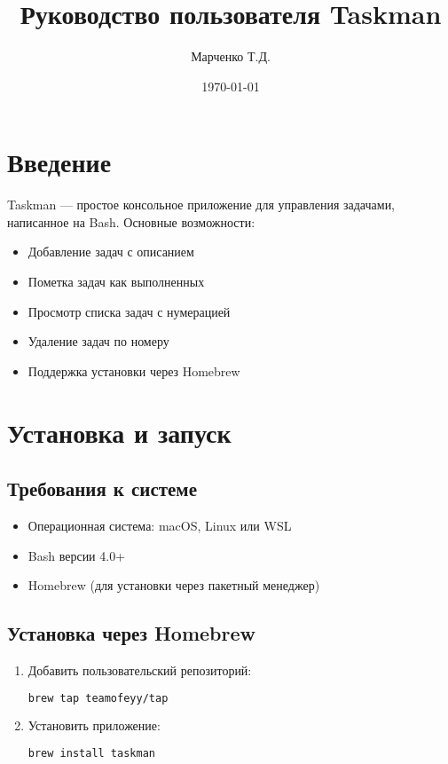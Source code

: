 \documentclass[a4paper,12pt]{article}
\title{Руководство пользователя Taskman}
\author{Марченко Т.Д.}
\date{\today}
\begin{document}
\maketitle
\tableofcontents

\section{Введение}
Taskman — простое консольное приложение для управления задачами, написанное на Bash. Основные возможности:
\begin{itemize}
\item Добавление задач с описанием
\item Пометка задач как выполненных
\item Просмотр списка задач с нумерацией
\item Удаление задач по номеру
\item Поддержка установки через Homebrew
\end{itemize}

\section{Установка и запуск}
\subsection{Требования к системе}
\begin{itemize}
\item Операционная система: macOS, Linux или WSL
\item Bash версии 4.0+
\item Homebrew (для установки через пакетный менеджер)
\end{itemize}

\subsection{Установка через Homebrew}
\begin{enumerate}
\item Добавить пользовательский репозиторий:
\begin{lstlisting}[language=bash]
brew tap teamofeyy/tap
\end{lstlisting}

\item Установить приложение:
\begin{lstlisting}[language=bash]
brew install taskman
\end{lstlisting}
\end{enumerate}
\end{document}
